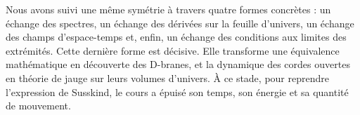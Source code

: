 \begin{classroomqa}
\end{classroomqa}

Nous avons suivi une même symétrie à travers quatre formes concrètes : un échange des spectres, un échange des dérivées sur la feuille d’univers, un échange des champs d’espace-temps et, enfin, un échange des conditions aux limites des extrémités. Cette dernière forme est décisive. Elle transforme une équivalence mathématique en découverte des D-branes, et la dynamique des cordes ouvertes en théorie de jauge sur leurs volumes d’univers. À ce stade, pour reprendre l’expression de Susskind, le cours a épuisé son temps, son énergie et sa quantité de mouvement.
